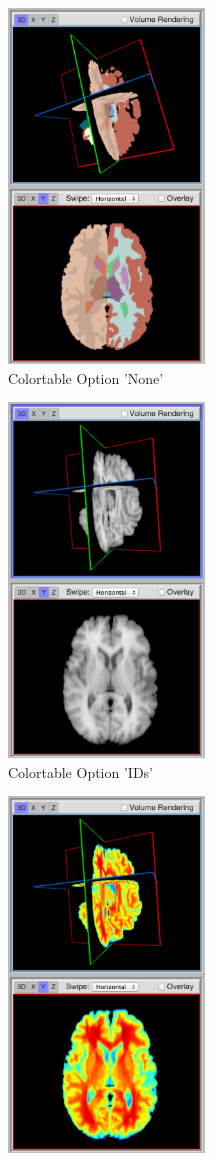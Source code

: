 \documentclass[a4paper,11pt,titlepage]{article}
\begin{document}
\begin{figure}
\centering
\begin{subfigure}{.33\textwidth}
  \centering
  \includegraphics[width=52mm]{graphics/ColortableB_01.png}
  \caption{Colortable Option 'None'}
\end{subfigure}%
\begin{subfigure}{.33\textwidth}
  \centering
  \includegraphics[width=52mm]{graphics/ColortableB_02.png}
  \caption{Colortable Option 'IDs'}
\end{subfigure}
\begin{subfigure}{.33\textwidth}
  \centering
  \includegraphics[width=52mm]{graphics/ColortableB_03.png}

\end{subfigure}
\end{figure}
\end{document}
